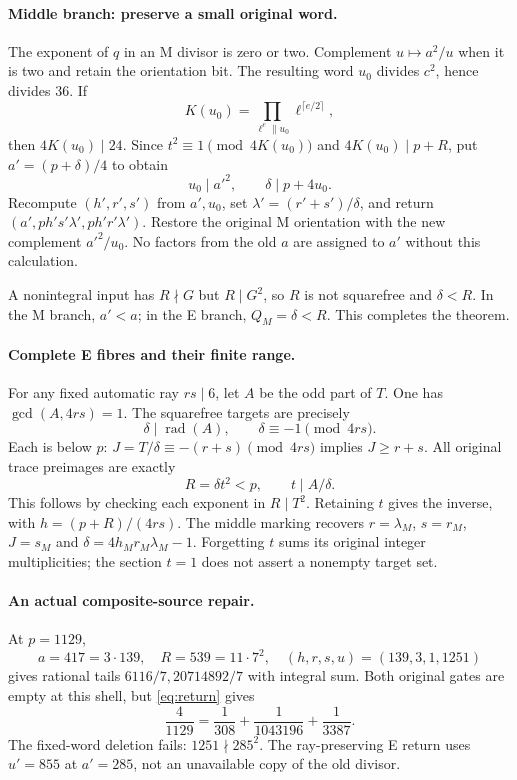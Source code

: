 \documentclass[11pt,reqno]{amsart}
\begin{document}
\paragraph{Middle branch: preserve a small original word.}
The exponent of $q$ in an M divisor is zero or two. Complement $u\mapsto a^2/u$
when it is two and retain the orientation bit. The resulting word $u_0$ divides
$c^2$, hence divides $36$. If
\[
 K(u_0)=\prod_{\ell^e\parallel u_0}\ell^{\lceil e/2\rceil},
\]
then $4K(u_0)\mid24$. Since $t^2\equiv1\pmod{4K(u_0)}$ and
$4K(u_0)\mid p+R$, put $a'=(p+\delta)/4$ to obtain
\[
 u_0\mid a'^2,\qquad \delta\mid p+4u_0.
\]
Recompute $(h',r',s')$ from $a',u_0$, set $\lambda'=(r'+s')/\delta$, and
return $(a',ph's'\lambda',ph'r'\lambda')$. Restore the original M orientation
with the new complement $a'^2/u_0$. No factors from the old $a$ are assigned to
$a'$ without this calculation.

A nonintegral input has $R\nmid G$ but $R\mid G^2$, so $R$ is not squarefree
and $\delta<R$. In the M branch, $a'<a$; in the E branch, $Q_M=\delta<R$.
This completes the theorem.

\paragraph{Complete E fibres and their finite range.}
For any fixed automatic ray $rs\mid6$, let $A$ be the odd part of $T$.
One has \(\gcd(A,4rs)=1\).
The squarefree targets are precisely
\[
 \delta\mid\operatorname{rad}(A),\qquad\delta\equiv-1\pmod{4rs}.
\]
Each is below $p$: $J=T/\delta\equiv-(r+s)\pmod{4rs}$ implies $J\ge r+s$.
All original trace preimages are exactly
\[
 R=\delta t^2<p,\qquad t\mid A/\delta.
\]
This follows by checking each exponent in $R\mid T^2$. Retaining $t$ gives
the inverse, with $h=(p+R)/(4rs)$. The middle marking recovers $r=\lambda_M$,
$s=r_M$, $J=s_M$ and $\delta=4h_Mr_M\lambda_M-1$. Forgetting $t$ sums its
original integer multiplicities; the section $t=1$ does not assert a nonempty
target set.

\paragraph{An actual composite-source repair.}
At $p=1129$,
\[
 a=417=3\cdot139,\quad R=539=11\cdot7^2,\quad
 (h,r,s,u)=(139,3,1,1251)
\]
gives rational tails $6116/7,20714892/7$ with integral sum. Both original gates
are empty at this shell, but \eqref{eq:return} gives
\[
 \frac4{1129}=\frac1{308}+\frac1{1043196}+\frac1{3387}.
\]
The fixed-word deletion fails: $1251\nmid285^2$. The ray-preserving E return
uses $u'=855$ at $a'=285$, not an unavailable copy of the old divisor.
\end{document}
